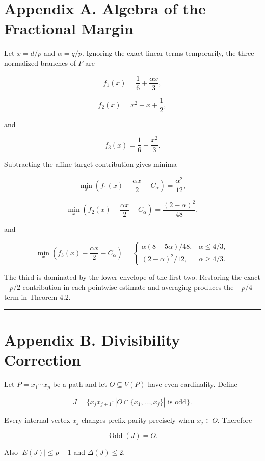 \documentclass[11pt,a4paper]{article}
\begin{document}
\section{Appendix A. Algebra of the Fractional Margin}\label{appendix-a.-algebra-of-the-fractional-margin}

Let \(x=d/p\) and \(\alpha=q/p\). Ignoring the exact linear terms temporarily, the three normalized branches of \(F\) are

\[
f_1(x)=\frac16+\frac{\alpha x}{3},
\]

\[
f_2(x)=x^2-x+\frac12,
\]

and

\[
f_3(x)=\frac16+\frac{x^2}{3}.
\]

Subtracting the affine target contribution gives minima

\[
\min_x\left(f_1(x)-\frac{\alpha x}{2}-C_\alpha\right)
=
\frac{\alpha^2}{12},
\]

\[
\min_x\left(f_2(x)-\frac{\alpha x}{2}-C_\alpha\right)
=
\frac{(2-\alpha)^2}{48},
\]

and

\[
\min_x\left(f_3(x)-\frac{\alpha x}{2}-C_\alpha\right)
=
\begin{cases}
\alpha(8-5\alpha)/48,&\alpha\le4/3,\\
(2-\alpha)^2/12,&\alpha\ge4/3.
\end{cases}
\]

The third is dominated by the lower envelope of the first two. Restoring the exact \(-p/2\) contribution in each pointwise estimate and averaging produces the \(-p/4\) term in Theorem 4.2.

\begin{center}\rule{0.5\linewidth}{0.5pt}\end{center}

\section{Appendix B. Divisibility Correction}\label{appendix-b.-divisibility-correction}

Let \(P=x_1\cdots x_p\) be a path and let \(O\subseteq V(P)\) have even cardinality. Define

\[
J=\{x_jx_{j+1}:|O\cap\{x_1,\ldots,x_j\}|\text{ is odd}\}.
\]

Every internal vertex \(x_j\) changes prefix parity precisely when \(x_j\in O\). Therefore

\[
\operatorname{Odd}(J)=O.
\]

Also \(|E(J)|\le p-1\) and \(\Delta(J)\le2\).
\end{document}

